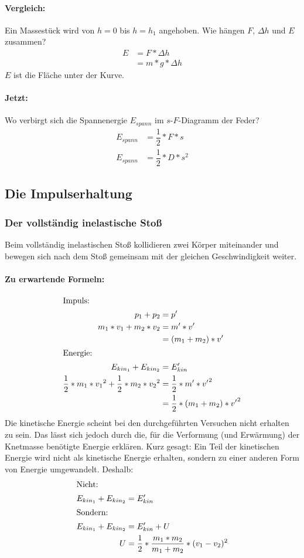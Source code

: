 	\paragraph{Vergleich:}
	Ein Massestück wird von $ h=0 $ bis $ h=h_1 $ angehoben. Wie hängen $ F $, $ \Delta h $ und $ E $ zusammen?
	\begin{align}
		E &= F*\Delta h\\
		&= m*g*\Delta h
	\end{align}
	$ E $ ist die Fläche unter der Kurve.
	\paragraph{Jetzt:}
	Wo verbirgt sich die Spannenergie $ E_{spann} $ im $ s $-$ F $-Diagramm der Feder?
	\begin{align}
		E_{spann} &= \dfrac{1}{2}*F*s\\
		E_{spann} &= \dfrac{1}{2}*D*s^2
	\end{align}
	
	\subsection{Die Impulserhaltung}
	\subsubsection{Der vollständig inelastische Stoß}
	Beim vollständig inelastischen Stoß kollidieren zwei Körper miteinander und bewegen sich nach dem Stoß gemeinsam mit der gleichen Geschwindigkeit weiter.
	\paragraph{Zu erwartende Formeln:}
	\begin{align}
		\intertext{Impuls:}
		p_1 + p_2 &= p'\\
		m_1*v_1+m_2*v_2 &= m'*v'\\
		&= (m_1+m_2)*v'\\
		\intertext{Energie:}
		E_{kin_{1}}+E_{kin_{2}} &= E'_{kin}\\
		\dfrac{1}{2}*m_1*{v_1}^2+\dfrac{1}{2}*m_2*{v_2}^2 &= \dfrac{1}{2}*m'*{v'}^2\\
		&= \dfrac{1}{2}*(m_1+m_2)*{v'}^2
	\end{align}
	Die kinetische Energie scheint bei den durchgeführten Versuchen nicht erhalten zu sein. Das lässt sich jedoch durch die, für die Verformung (und Erwärmung) der Knetmasse benötigte Energie erklären. Kurz gesagt: Ein Teil der kinetischen Energie wird nicht als kinetische Energie erhalten, sondern zu einer anderen Form von Energie umgewandelt. Deshalb:
	\begin{align}
		\intertext{Nicht:}
		E_{kin_{1}}+E_{kin_{2}} &= E'_{kin}\\
		\intertext{Sondern:}
		E_{kin_{1}}+E_{kin_{2}} &= E'_{kin}+U\\
		U &= \dfrac{1}{2}*\dfrac{m_1*m_2}{m_1+m_2}*(v_1-v_2)^2
	\end{align}
